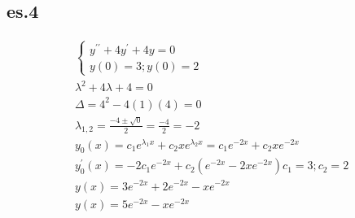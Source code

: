 \documentclass{article}
\begin{document}
\subsection{es.4}
\begin{equation*}
	\begin{matrix}
		\begin{cases}
			y^{\prime\prime}+4y^\prime+4y=0\\
			y(0)=3; y(0)=2
		\end{cases}\\
		\lambda^2+4\lambda+4=0\\
		\Delta=4^2-4(1)(4)=0\\
		\lambda_{1,2}=\frac{-4\pm\sqrt{0}}{2}=\frac{-4}{2}=-2\\
		y_0(x)=c_1e^{\lambda_1x}+c_2xe^{\lambda_2x} =c_1e^{-2x}+c_2xe^{-2x}\\
		y_0^\prime(x)=-2c_1e^{-2x}+c_2(e^{-2x}-2xe^{-2x})
		c_1=3;c_2=2\\
		y(x)=3e^{-2x}+2e^{-2x}-xe^{-2x}\\
		y(x)=5e^{-2x}-xe^{-2x}
	\end{matrix}
\end{equation*}
\clearpage
\end{document}
